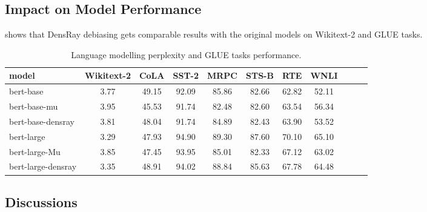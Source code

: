 
\subsection{Impact on Model Performance}
 shows that DensRay debiasing gets comparable results with
the original models on Wikitext-2 and GLUE tasks.
\begin{table}[ht]
\centering
\footnotesize
\begin{tabular}{lcccccccccc}
\hline
model & Wikitext-2&CoLA &SST-2&MRPC&STS-B&RTE&WNLI\\
\hline
bert-base &3.77&49.15&92.09&85.86&82.66&62.82&52.11\\
bert-base-mu &3.95&45.53&91.74&82.48&82.60&63.54&56.34\\
bert-base-densray &3.81&48.04&91.74&84.89&82.43&63.90&53.52\\
\hline
bert-large &3.29& 47.93&94.90&89.30&87.60&70.10&65.10\\
bert-large-Mu &3.85& 47.45&93.95&85.01&82.33&67.12&63.02\\
bert-large-densray &3.35& 48.91&94.02&88.84&85.63&67.78&64.48\\
\hline
\end{tabular}
\caption{
Language modelling perplexity and GLUE tasks
performance. }
\end{table}

\subsection{Discussions}

